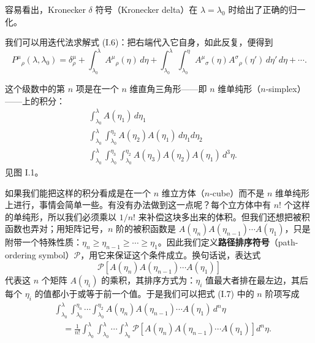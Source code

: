 容易看出，Kronecker $\delta$ 符号（Kronecker delta）在 $\lambda=\lambda_0$ 时给出了正确的归一化。

我们可以用迭代法求解式 (I.6)：把右端代入它自身，如此反复，便得到
\begin{equation*}
P^\mu{}_\rho(\lambda,\lambda_0) = \delta^\mu_\rho + \int_{\lambda_0}^{\lambda} A^\mu{}_\rho(\eta)\,d\eta + \int_{\lambda_0}^{\lambda}\int_{\lambda_0}^{\eta} A^\mu{}_\sigma(\eta)A^\sigma{}_\rho(\eta')\,d\eta'\,d\eta + \cdots.
\tag{I.7}
\end{equation*}

这个级数中的第 $n$ 项是在一个 $n$ 维直角三角形——即 $n$ 维单纯形（$n$-simplex）——上的积分：
\begin{align*}
&\int_{\lambda_0}^{\lambda} A(\eta_1)\,d\eta_1 \\
&\int_{\lambda_0}^{\lambda}\int_{\lambda_0}^{\eta_2} A(\eta_2)A(\eta_1)\,d\eta_1 d\eta_2 \\
&\int_{\lambda_0}^{\lambda}\int_{\lambda_0}^{\eta_3}\int_{\lambda_0}^{\eta_2} A(\eta_3)A(\eta_2)A(\eta_1)\,d^3\eta.
\end{align*}
见图 I.1。


如果我们能把这样的积分看成是在一个 $n$ 维立方体（$n$-cube）而不是 $n$ 维单纯形上进行，事情会简单一些。有没有办法做到这一点呢？每个立方体中有 $n!$ 个这样的单纯形，所以我们必须乘以 $1/n!$ 来补偿这块多出来的体积。但我们还想把被积函数也弄对；用矩阵记号，$n$ 阶的被积函数是 $A(\eta_n)A(\eta_{n-1})\cdots A(\eta_1)$，只是附带一个特殊性质：$\eta_n \ge \eta_{n-1} \ge \cdots \ge \eta_1$。因此我们定义\textbf{路径排序符号}（path-ordering symbol）$\mathcal{P}$，用它来保证这个条件成立。换句话说，表达式
\begin{equation*}
\mathcal{P}\left[A(\eta_n)A(\eta_{n-1})\cdots A(\eta_1)\right]
\tag{I.8}
\end{equation*}
代表这 $n$ 个矩阵 $A(\eta_i)$ 的乘积，其排序方式为：$\eta_i$ 值最大者排在最左边，其后每个 $\eta_i$ 的值都小于或等于前一个值。于是我们可以把式 (I.7) 中的 $n$ 阶项写成
\begin{align*}
&\int_{\lambda_0}^{\lambda}\int_{\lambda_0}^{\eta_n}\cdots\int_{\lambda_0}^{\eta_2} A(\eta_n)A(\eta_{n-1})\cdots A(\eta_1)\,d^n\eta \\
&\quad = \frac{1}{n!}\int_{\lambda_0}^{\lambda}\int_{\lambda_0}^{\lambda}\cdots\int_{\lambda_0}^{\lambda} \mathcal{P}\left[A(\eta_n)A(\eta_{n-1})\cdots A(\eta_1)\right] d^n\eta.
\tag{I.9}
\end{align*}

